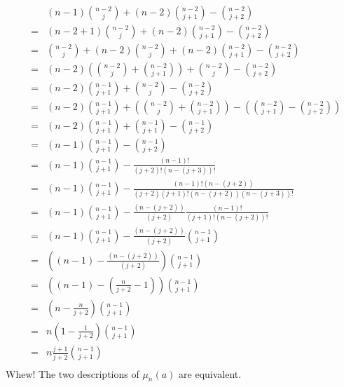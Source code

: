 \documentclass{article}
\begin{document}
\begin{eqnarray*}
& & (n-1)\binom{n-2}{j} + (n-2)\binom{n-2}{j+1} - \binom{n-2}{j+2} \\
&=& (n-2 + 1)\binom{n-2}{j} + (n-2)\binom{n-2}{j+1} - \binom{n-2}{j+2} \\
&=& \binom{n-2}{j} + (n-2)\binom{n-2}{j} + (n-2)\binom{n-2}{j+1} - \binom{n-2}{j+2} \\
&=& (n-2)\left(\binom{n-2}{j} + \binom{n-2}{j+1}\right) + \binom{n-2}{j} - \binom{n-2}{j+2} \\
&=& (n-2)\binom{n-1}{j + 1} + \binom{n-2}{j} - \binom{n-2}{j+2} \\
&=& (n-2)\binom{n-1}{j + 1} + \left( \binom{n-2}{j} + \binom{n-2}{j+1}  \right)-
\left( \binom{n-2}{j+1} - \binom{n-2}{j+2}  \right)\\
&=& (n-2)\binom{n-1}{j + 1} + \binom{n-1}{j+1} - \binom{n-1}{j+2}\\
&=& (n-1)\binom{n-1}{j + 1} - \binom{n-1}{j+2}\\
&=& (n-1)\binom{n-1}{j + 1} - \frac{(n-1)!}{(j+2)!(n-(j+3))!}\\
&=& (n-1)\binom{n-1}{j + 1} - \frac{(n-1)!(n-(j+2))}{(j+2)(j+1)!(n-(j+2))(n-(j+3))!}\\
&=& (n-1)\binom{n-1}{j + 1} - \frac{(n-(j+2))}{(j+2)}\frac{(n-1)!}{(j+1)!(n-(j+2))!}\\
&=& (n-1)\binom{n-1}{j + 1} - \frac{(n-(j+2))}{(j+2)}\binom{n-1}{j+1}\\
&=& \left( (n-1)- \frac{(n-(j+2))}{(j+2)} \right)\binom{n-1}{j+1}\\
&=& \left( (n-1)- \left(\frac{n}{j+2} - 1\right) \right)\binom{n-1}{j+1}\\
&=& \left( n- \frac{n}{j+2} \right)\binom{n-1}{j+1}\\
&=& n\left(1 - \frac{1}{j+2} \right)\binom{n-1}{j+1}\\
&=& n\frac{j+1}{j+2} \binom{n-1}{j+1}\\
\end{eqnarray*}
Whew! The two descriptions of $\mu_n(a)$ are equivalent.
\end{document}
